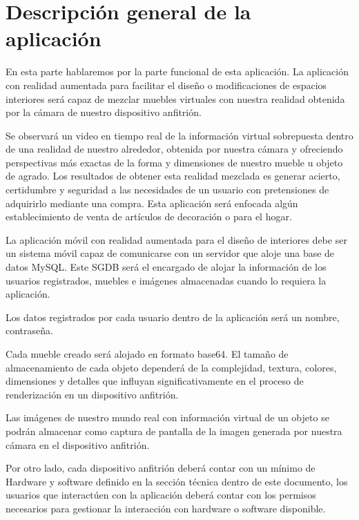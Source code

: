 \section{Descripción general de la aplicación}
En esta parte hablaremos por la parte funcional de esta aplicación. La aplicación con realidad aumentada para facilitar el diseño o modificaciones de espacios interiores será capaz de mezclar muebles virtuales con nuestra realidad obtenida por la cámara de nuestro dispositivo anfitrión. \par
\vspace{5mm}

 Se observará un video en tiempo real de la información virtual sobrepuesta dentro de una realidad de nuestro alrededor, obtenida por nuestra cámara y ofreciendo perspectivas más exactas de la forma y dimensiones de nuestro mueble u objeto de agrado. Los resultados de obtener esta realidad mezclada es generar acierto, certidumbre y seguridad a las necesidades de un usuario con pretensiones de adquirirlo mediante una compra. Esta aplicación será enfocada algún establecimiento de venta de artículos de decoración o para el hogar.  \par
\vspace{5mm}

La aplicación móvil con realidad aumentada para el diseño de interiores debe ser un sistema móvil capaz de comunicarse con un servidor que aloje una base de datos MySQL.  Este SGDB será el encargado de alojar la información de los usuarios registrados, muebles e imágenes almacenadas cuando lo requiera la aplicación.  \par
\vspace{5mm}

Los datos registrados por cada usuario dentro de la aplicación será un nombre, contraseña.\par
\vspace{5mm}  

Cada mueble creado será alojado en formato base64. El tamaño de almacenamiento de cada objeto dependerá de la complejidad, textura, colores, dimensiones y detalles que influyan significativamente en el proceso de renderización en un dispositivo anfitrión.\par
\vspace{5mm}

Las imágenes de nuestro mundo real con información virtual de un objeto se podrán almacenar como captura de pantalla de la imagen generada por nuestra cámara en el dispositivo anfitrión.\par
\vspace{5mm}

Por otro lado, cada dispositivo anfitrión deberá contar con un mínimo de Hardware y software definido en la sección técnica dentro de este documento, los usuarios que interactúen con la aplicación  deberá contar con los permisos necesarios para  gestionar  la interacción con hardware o software disponible.\par
\vspace{5mm}